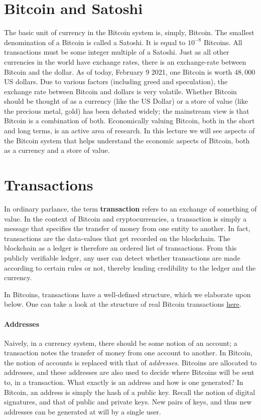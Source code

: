 \documentclass{article}
\begin{document}
\section*{Bitcoin and Satoshi}
The basic unit of currency in the Bitcoin system is, simply, Bitcoin. The smallest denomination of a Bitcoin is called a Satoshi. It is equal to $10^{-8}$ Bitcoins. All transactions must be some integer multiple of a Satoshi. Just as all other currencies in the world have exchange rates, there is an exchange-rate between Bitcoin and the dollar. As of today, February 9 2021, one Bitcoin is worth $48,000$ US dollars. Due to various factors (including greed and speculation), the exchange rate between Bitcoin and dollars is very volatile. Whether Bitcoin should be thought of as a currency (like the US Dollar) or a store of value (like the precious metal, gold) has been debated widely; the mainstream view is that Bitcoin is a combination of both. Economically valuing Bitcoin, both in the short and long terms, is an active area of research. In this lecture we will see aspects of the Bitcoin system that helps understand the economic aspects of Bitcoin, both as a currency and a store of value. 

\section*{Transactions}
In ordinary parlance, the term \textbf{transaction} refers to an exchange of something of value. In the context of Bitcoin and cryptocurrencies, a transaction is simply a message that specifies the transfer of money from one entity to another. In fact, transactions are the data-values that get recorded on the blockchain. The blockchain as a ledger is therefore an ordered list of transactions. From this publicly verifiable ledger, any user can detect whether transactions are made according to certain rules or not, thereby lending credibility to the ledger and the currency.

In Bitcoins, transactions have a well-defined structure, which we elaborate upon below. One can take a look at the structure of real Bitcoin transactions \href{https://www.blockchain.com/explorer}{here}.

\paragraph{Addresses}
Naively, in a currency system, there should be some notion of an account; a transaction notes the transfer of money from one account to another. In Bitcoin, the notion of accounts is replaced with that of \textit{addresses}. Bitcoins are allocated to addresses, and these addresses are also used to decide where Bitcoins will be sent to, in a transaction. What exactly is an address and how is one generated? In Bitcoin, an address is simply the hash of a public key. Recall the notion of digital signatures, and that of public and private keys. New pairs of keys, and thus new addresses can be generated at will by a single user.
\end{document}

